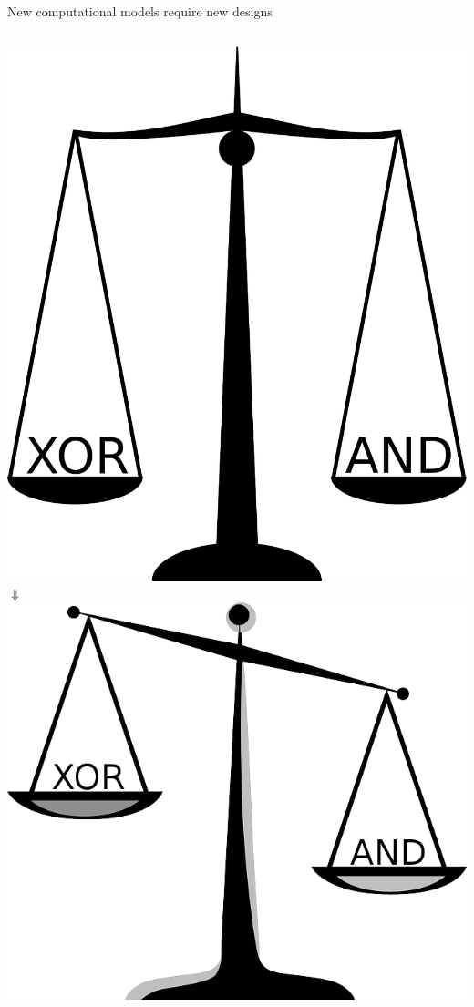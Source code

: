 \documentclass[10pt,compress]{beamer}
\begin{document}
\begin{frame}{New computational models require new designs}
\begin{columns}
\begin{column}{0.25\textwidth}
  \centering
  \includegraphics[scale=0.15]{figures/scale.pdf}\\[0.3cm]
  {\huge $\Downarrow$}\\[0.3cm]
  \includegraphics[scale=0.12]{figures/scale.png}

\end{column}
\end{columns}
\end{frame}
\end{document}
